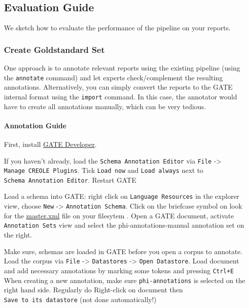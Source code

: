 \subsection{Evaluation Guide}\label{evaluation-guide}

We sketch how to evaluate the performance of the pipeline on your
reports.

\subsubsection{Create Goldstandard Set}\label{create-goldstandard-set}

One approach is to annotate relevant reports using the existing pipeline
(using the \texttt{annotate} command) and let experts check/complement
the resulting annotations. Alternatively, you can simply convert the
reports to the GATE internal format using the \texttt{import} command.
In this case, the annotator would have to create all annotations
manually, which can be very tedious.

\paragraph{Annotation Guide}\label{annotation-guide}

First, install \href{https://gate.ac.uk/download/}{GATE Developer}.

If you haven't already, load the \texttt{Schema\ Annotation\ Editor} via
\texttt{File} -\textgreater{} \texttt{Manage\ CREOLE\ Plugins}. Tick
\texttt{Load\ now} and \texttt{Load\ always} next to
\texttt{Schema\ Annotation\ Editor}. Restart GATE

Load a schema into GATE: right click on \texttt{Language\ Resources} in
the explorer view, choose \texttt{New} -\textgreater{}
\texttt{Annotation\ Schema}. Click on the briefcase symbol on look for
the
\href{https://github.com/ratschlab/medical-reports-deidentification/blob/main/deidentifier-pipeline/src/main/resources/schemas/master.xml}{master.xml}
file on your filesytem . Open a GATE document, activate
\texttt{Annotation\ Sets} view and select the phi-annotations-manual
annotation set on the right.

Make sure, schemas are loaded in GATE before you open a corpus to
annotate. Load the corpus via \texttt{File} -\textgreater{}
\texttt{Datastores} -\textgreater{} \texttt{Open\ Datastore}. Load
document and add necessary annotations by marking some tokens and
pressing \texttt{Ctrl+E} When creating a new annotation, make sure
\texttt{phi-annotations} is selected on the right hand side. Regularly
do Right-click on document then \texttt{Save\ to\ its\ datastore} (not
done automatically!)

